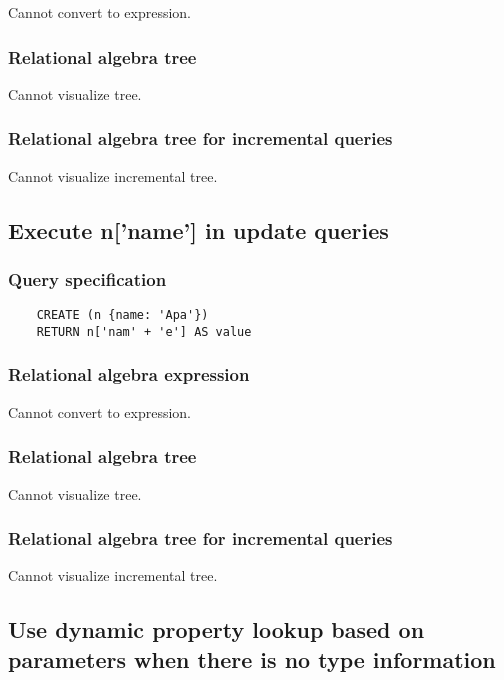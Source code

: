 	Cannot convert to expression.

	\subsubsection*{Relational algebra tree}

	Cannot visualize tree.

	\subsubsection*{Relational algebra tree for incremental queries}

	Cannot visualize incremental tree.
	\subsection{Execute n['name'] in update queries}

	\subsubsection*{Query specification}

	\begin{lstlisting}
	CREATE (n {name: 'Apa'})
	RETURN n['nam' + 'e'] AS value
	\end{lstlisting}


	\subsubsection*{Relational algebra expression}

	Cannot convert to expression.

	\subsubsection*{Relational algebra tree}

	Cannot visualize tree.

	\subsubsection*{Relational algebra tree for incremental queries}

	Cannot visualize incremental tree.
	\subsection{Use dynamic property lookup based on parameters when there is no type information}

